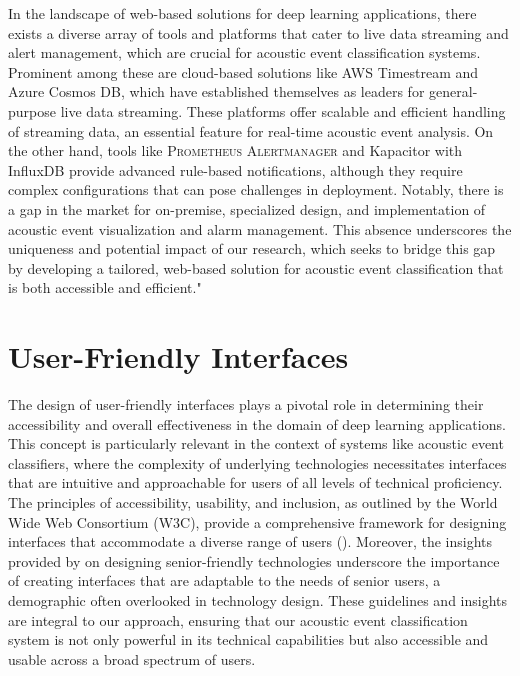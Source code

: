 In the landscape of web-based solutions for deep learning applications, there exists a diverse array of tools and platforms that cater to live data streaming and alert management, which are crucial for acoustic event classification systems. Prominent among these are cloud-based solutions like AWS Timestream\cite{AWSTimestream} and Azure Cosmos DB\cite{AzureCosmos}, which have established themselves as leaders for general-purpose live data streaming. These platforms offer scalable and efficient handling of streaming data, an essential feature for real-time acoustic event analysis. On the other hand, tools like \textsc{Prometheus} \textsc{Alertmanager}\cite{AlertManager} and Kapacitor with InfluxDB\cite{kapacitor} provide advanced rule-based notifications, although they require complex configurations that can pose challenges in deployment. Notably, there is a gap in the market for on-premise, specialized design, and implementation of acoustic event visualization and alarm management. This absence underscores the uniqueness and potential impact of our research, which seeks to bridge this gap by developing a tailored, web-based solution for acoustic event classification that is both accessible and efficient."

\section{User-Friendly Interfaces}

The design of user-friendly interfaces plays a pivotal role in determining their accessibility and overall effectiveness in the domain of deep learning applications. This concept is particularly relevant in the context of systems like acoustic event classifiers, where the complexity of underlying technologies necessitates interfaces that are intuitive and approachable for users of all levels of technical proficiency. The principles of accessibility, usability, and inclusion, as outlined by the World Wide Web Consortium (W3C), provide a comprehensive framework for designing interfaces that accommodate a diverse range of users (\cite{w3AccessibilityUsability}). Moreover, the insights provided by \cite{SeniorfriendlyTechnologies} on designing senior-friendly technologies underscore the importance of creating interfaces that are adaptable to the needs of senior users, a demographic often overlooked in technology design. These guidelines and insights are integral to our approach, ensuring that our acoustic event classification system is not only powerful in its technical capabilities but also accessible and usable across a broad spectrum of users.